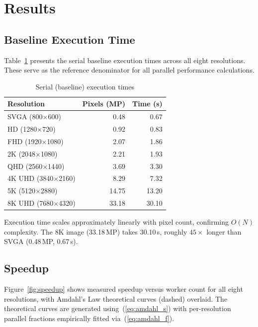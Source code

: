 \documentclass[conference]{IEEEtran}
\begin{document}
\section{Results}

\subsection{Baseline Execution Time}

Table~\ref{tab:serial} presents the serial baseline execution times across
all eight resolutions.  These serve as the reference denominator for all
parallel performance calculations.

\begin{table}[h]
\centering
\caption{Serial (baseline) execution times}
\label{tab:serial}
\renewcommand{\arraystretch}{1.15}
\begin{tabular}{@{}lrr@{}}
\toprule
\textbf{Resolution} & \textbf{Pixels (MP)} & \textbf{Time (s)} \\
\midrule
SVGA (800$\times$600)      & 0.48  & 0.67  \\
HD (1280$\times$720)       & 0.92  & 0.83  \\
FHD (1920$\times$1080)     & 2.07  & 1.86  \\
2K (2048$\times$1080)      & 2.21  & 1.93  \\
QHD (2560$\times$1440)     & 3.69  & 3.30  \\
4K UHD (3840$\times$2160)  & 8.29  & 7.32  \\
5K (5120$\times$2880)      & 14.75 & 13.20 \\
8K UHD (7680$\times$4320)  & 33.18 & 30.10 \\
\bottomrule
\end{tabular}
\end{table}

Execution time scales approximately linearly with pixel count, confirming
$O(N)$ complexity.  The 8K image (33.18\,MP) takes 30.10\,s, roughly
$45\times$ longer than SVGA (0.48\,MP, 0.67\,s).

\subsection{Speedup}

Figure~\ref{fig:speedup} shows measured speedup versus worker count for all
eight resolutions, with Amdahl's Law theoretical curves (dashed) overlaid.
The theoretical curves are generated using~(\ref{eq:amdahl_s}) with
per-resolution parallel fractions empirically fitted via~(\ref{eq:amdahl_f}).
\end{document}

